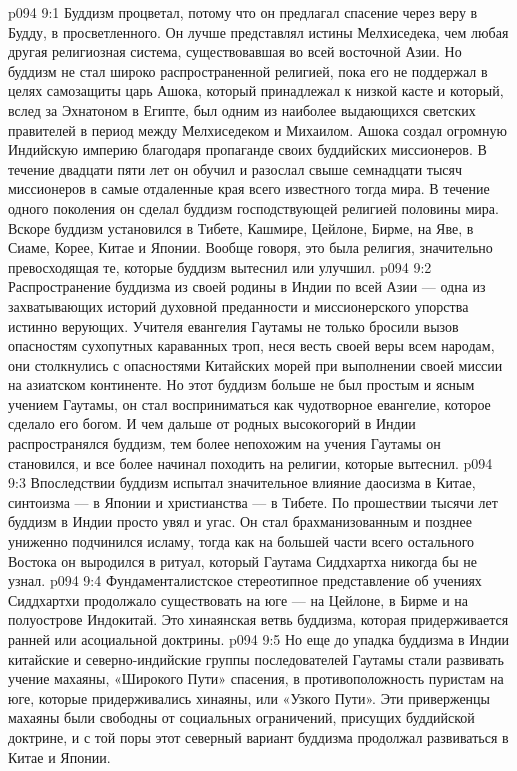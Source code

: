 \vs p094 9:1 Буддизм процветал, потому что он предлагал спасение через веру в Будду, в просветленного. Он лучше представлял истины Мелхиседека, чем любая другая религиозная система, существовавшая во всей восточной Азии. Но буддизм не стал широко распространенной религией, пока его не поддержал в целях самозащиты царь Ашока, который принадлежал к низкой касте и который, вслед за Эхнатоном в Египте, был одним из наиболее выдающихся светских правителей в период между Мелхиседеком и Михаилом. Ашока создал огромную Индийскую империю благодаря пропаганде своих буддийских миссионеров. В течение двадцати пяти лет он обучил и разослал свыше семнадцати тысяч миссионеров в самые отдаленные края всего известного тогда мира. В течение одного поколения он сделал буддизм господствующей религией половины мира. Вскоре буддизм установился в Тибете, Кашмире, Цейлоне, Бирме, на Яве, в Сиаме, Корее, Китае и Японии. Вообще говоря, это была религия, значительно превосходящая те, которые буддизм вытеснил или улучшил.
\vs p094 9:2 Распространение буддизма из своей родины в Индии по всей Азии --- одна из захватывающих историй духовной преданности и миссионерского упорства истинно верующих. Учителя евангелия Гаутамы не только бросили вызов опасностям сухопутных караванных троп, неся весть своей веры всем народам, они столкнулись с опасностями Китайских морей при выполнении своей миссии на азиатском континенте. Но этот буддизм больше не был простым и ясным учением Гаутамы, он стал восприниматься как чудотворное евангелие, которое сделало его богом. И чем дальше от родных высокогорий в Индии распространялся буддизм, тем более непохожим на учения Гаутамы он становился, и все более начинал походить на религии, которые вытеснил.
\vs p094 9:3 Впоследствии буддизм испытал значительное влияние даосизма в Китае, синтоизма --- в Японии и христианства --- в Тибете. По прошествии тысячи лет буддизм в Индии просто увял и угас. Он стал брахманизованным и позднее униженно подчинился исламу, тогда как на большей части всего остального Востока он выродился в ритуал, который Гаутама Сиддхартха никогда бы не узнал.
\vs p094 9:4 Фундаменталистское стереотипное представление об учениях Сиддхартхи продолжало существовать на юге --- на Цейлоне, в Бирме и на полуострове Индокитай. Это хинаянская ветвь буддизма, которая придерживается ранней или асоциальной доктрины.
\vs p094 9:5 Но еще до упадка буддизма в Индии китайские и северно\hyp{}индийские группы последователей Гаутамы стали развивать учение махаяны, «Широкого Пути» спасения, в противоположность пуристам на юге, которые придерживались хинаяны, или «Узкого Пути». Эти приверженцы махаяны были свободны от социальных ограничений, присущих буддийской доктрине, и с той поры этот северный вариант буддизма продолжал развиваться в Китае и Японии.
